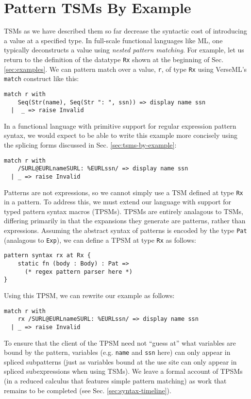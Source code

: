 \section{Pattern TSMs By Example}
TSMs as we have described them so far decrease the syntactic cost of introducing a value at a specified type. In full-scale functional languages like ML, one typically deconstructs a value using \emph{nested pattern matching}. For example, let us return to the definition of the datatype \lstinline{Rx} shown at the beginning of Sec. \ref{sec:examples}. We can pattern match over a value, \lstinline{r}, of type \lstinline{Rx} using VerseML's \lstinline{match} construct like this:
\begin{lstlisting}[numbers=none]
match r with 
    Seq(Str(name), Seq(Str ": ", ssn)) => display name ssn
  |  _ => raise Invalid
\end{lstlisting}
In a functional language with primitive support for regular expression pattern syntax, we would expect to be able to write this example more concisely using the splicing forms discussed in Sec. \ref{sec:tsms-by-example}:
\begin{lstlisting}[numbers=none]
match r with 
    /SURL@EURLnameSURL: %EURLssn/ => display name ssn
  | _ => raise Invalid
\end{lstlisting}

Patterns are not expressions, so we cannot simply use a TSM defined at type \lstinline{Rx} in a pattern. To address this, we must extend our language with support for typed pattern syntax macros (TPSMs). TPSMs are entirely analagous to TSMs, differing primarily in that the expansions they generate are patterns, rather than expressions. Assuming the abstract syntax of patterns is encoded by the type \lstinline{Pat} (analagous to \lstinline{Exp}), we can define a TPSM at type \lstinline{Rx} as follows:
\begin{lstlisting}[numbers=none]
pattern syntax rx at Rx {
	static fn (body : Body) : Pat => 
	  (* regex pattern parser here *)
}
\end{lstlisting}

Using this TPSM, we can rewrite our example as follows:
\begin{lstlisting}[numbers=none]
match r with 
    rx /SURL@EURLnameSURL: %EURLssn/ => display name ssn
  | _ => raise Invalid
\end{lstlisting}
To ensure that the client of the TPSM need not ``guess at'' what variables are bound by the pattern, variables (e.g. \lstinline{name} and \lstinline{ssn} here) can only appear in spliced subpatterns (just as variables bound at the use site can only appear in spliced subexpressions when using TSMs). We leave a formal account of TPSMs (in a reduced calculus that features simple pattern matching) as work that remains to be completed (see Sec. \ref{sec:syntax-timeline}).

